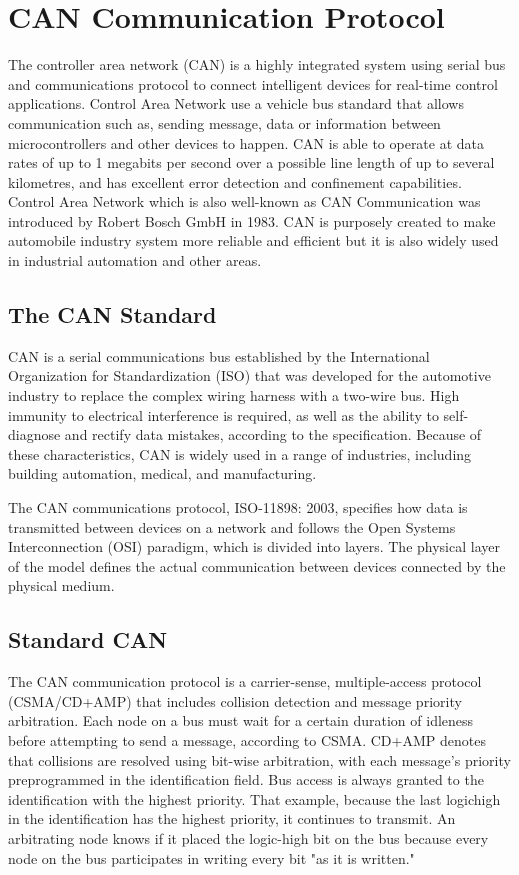 
\section{CAN Communication Protocol}

The controller area network (CAN) is a highly integrated system using serial bus and communications protocol to connect intelligent devices for real-time control applications. Control Area Network use a vehicle bus standard that allows communication such as, sending message, data or information between microcontrollers and other devices to happen. CAN is able to operate at data rates of up to 1 megabits per second over a possible line length of up to several kilometres, and has excellent error detection and confinement capabilities. Control Area Network which is also well-known as CAN Communication was introduced by Robert Bosch GmbH in 1983. CAN is purposely created to make automobile industry system more reliable and efficient but it is also widely used in industrial automation and other areas. 
\subsection{The CAN Standard }

CAN is a serial communications bus established by the International Organization for Standardization (ISO) that was developed for the automotive industry to replace the complex wiring harness with a two-wire bus. High immunity to electrical interference is required, as well as the ability to self-diagnose and rectify data mistakes, according to the specification. Because of these characteristics, CAN is widely used in a range of industries, including building automation, medical, and manufacturing.


The CAN communications protocol, ISO-11898: 2003, specifies how data is transmitted between devices on a network and follows the Open Systems Interconnection (OSI) paradigm, which is divided into layers. The physical layer of the model defines the actual communication between devices connected by the physical medium. 

\subsection{Standard CAN }

The CAN communication protocol is a carrier-sense, multiple-access protocol (CSMA/CD+AMP) that includes collision detection and message priority arbitration. Each node on a bus must wait for a certain duration of idleness before attempting to send a message, according to CSMA. CD+AMP denotes that collisions are resolved using bit-wise arbitration, with each message's priority preprogrammed in the identification field. Bus access is always granted to the identification with the highest priority. That example, because the last logichigh in the identification has the highest priority, it continues to transmit. An arbitrating node knows if it placed the logic-high bit on the bus because every node on the bus participates in writing every bit "as it is written."

